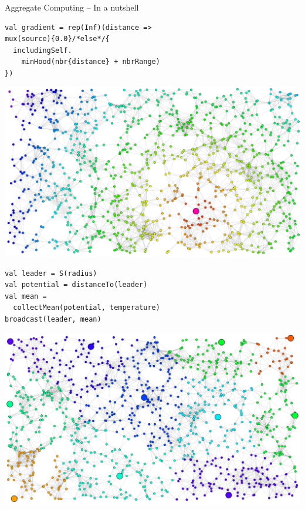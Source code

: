 \documentclass[8pt, aspectratio=169, handout]{beamer}
\begin{document}
\begin{frame}[fragile]{Aggregate Computing -- In a nutshell}
  \begin{multicols}{2}
    \begin{card}[Gradient]
    \begin{verbatim}
val gradient = rep(Inf)(distance =>
mux(source){0.0}/*else*/{
  includingSelf.
    minHood(nbr{distance} + nbrRange)
})
    \end{verbatim}
    \centering
    \includegraphics[width=0.7\linewidth]{img/result-gradient.png}
    \end{card}
    \begin{card}
    \begin{verbatim}
val leader = S(radius)
val potential = distanceTo(leader)
val mean =
  collectMean(potential, temperature)
broadcast(leader, mean)
  \end{verbatim}  
  \centering
  \includegraphics[width=0.68\linewidth]{img/distributed-sensing.png}   
  \end{card}
  \end{multicols}
\end{frame}
\end{document}
